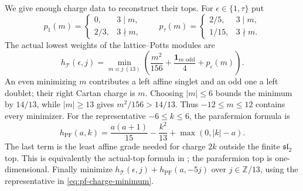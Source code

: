 \documentclass[11pt,a4paper]{article}
\theoremstyle{definition}
\begin{document}
We give enough charge data to reconstruct their tops. For
$\epsilon\in\{1,\tau\}$ put
\[
 p_1(m)=\begin{cases}0,&3\mid m,\\2/3,&3\nmid m,\end{cases}
 \qquad
 p_\tau(m)=\begin{cases}2/5,&3\mid m,\\1/15,&3\nmid m.\end{cases}
\]
The actual lowest weights of the lattice--Potts modules are
\begin{equation}
 h_{\mathcal T}(\epsilon,j)
 =\min_{m\equiv j\ (13)}
 \left(\frac{m^2}{156}+\frac{\mathbf1_{m\text{ odd}}}{4}
                   +p_\epsilon(m)\right).
 \label{eq:core-charge-minimum}
\end{equation}
An even minimizing $m$ contributes a left affine singlet and an odd
one a left doublet; their right Cartan charge is $m$. Choosing
$|m|\le6$ bounds the minimum by $14/13$, while $|m|\ge13$ gives
$m^2/156>14/13$. Thus $-12\le m\le12$ contains every minimizer.
For the representative $-6\le k\le6$, the parafermion formula is
\begin{equation}
 h_{\mathrm{PF}}(a,k)
 =\frac{a(a+1)}{15}-\frac{k^2}{13}+\max(0,|k|-a).
 \label{eq:pf-charge-minimum}
\end{equation}
The last term is the least affine grade needed for charge $2k$
outside the finite $\mathfrak{sl}_2$ top. This is equivalently the
actual-top formula in \cite[Section~2.4]{ALY}; the parafermion top is
one-dimensional. Finally minimize
$h_{\mathcal T}(\epsilon,j)+h_{\mathrm{PF}}(a,-5j)$ over
$j\in\mathbb Z/13$, using the representative in
\eqref{eq:pf-charge-minimum}.
\end{document}
